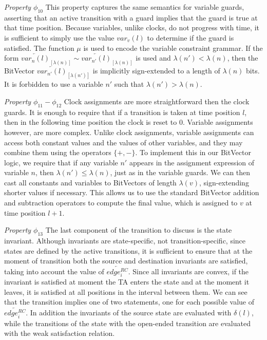 \documentclass[a4paper,11pt]{report}
\theoremstyle{definition}
\begin{document}
\emph{Property $\phi_{10}$} This property captures the same semantics for
variable guards, asserting that an active transition with a guard implies that
the guard is true at that time position. Because variables, unlike clocks, do
not progress with time, it is sufficient to simply use the value \(var_{v}(l)\)
to determine if the guard is satisfied. The function $\mu$ is used to encode the
variable constraint grammar. If the form
$\overleftarrow{var_{n}(l)}_{[\lambda(n)]} \sim \overleftarrow{var_{n'}(l)}_{[\lambda(n)]}$
is used and $\lambda(n') < \lambda(n)$, then the BitVector
$\overleftarrow{var_{n'}(l)}_{[\lambda(n')]}$ is implicitly sign-extended to a
length of $\lambda(n)$ bits. It is forbidden to use a variable $n'$ such that
$\lambda(n') > \lambda(n)$.

\emph{Property $\phi_{11} - \phi_{12}$} Clock assignments are more
straightforward then the clock guards. It is enough to require that if a
transition is taken at time position \(l\), then in the following time position
the clock is reset to 0. Variable assignments however, are more complex. Unlike
clock assignments, variable assignments can access both constant values and the
values of other variables, and they may combine them using the operators
\(\{+,-\}\). To implement this in our BitVector logic, we require that if any
variable \(n'\) appears in the assignment expression of variable \(n\), then
$\lambda(n') \leq \lambda(n)$, just as in the variable guards. We can then cast
all constants and variables to BitVectors of length \(\lambda(v)\),
sign-extending shorter values if necessary. This allows us to use the standard
BitVector addition and subtraction operators to compute the final value, which
is assigned to \(v\) at time position \(l{+}1\).

\emph{Property $\phi_{13}$} The last component of the transition to discuss is
the state invariant. Although invariants are state-specific, not
transition-specific, since states are defined by the active transitions, it is
sufficient to ensure that at the moment of transition both the source and
destination invariants are satisfied, taking into account the value of
$\overleftarrow{edge_{i}^{RC}}$. Since all invariants are convex, if the
invariant is satisfied at moment the TA enters the state and at the moment it
leaves, it is satisfied at all positions in the interval between them. We can
see that the transition implies one of two statements, one for each possible
value of $\overleftarrow{edge_{i}^{RC}}$. In addition the invariants of the
source state are evaluated with $\delta(l)$, while the transitions of the state
with the open-ended transition are evaluated with the weak satisfaction
relation.
\end{document}
